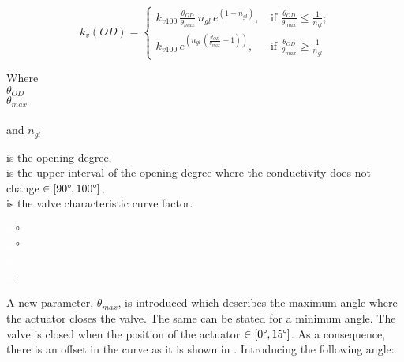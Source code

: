 \begin{equation}
\label{kvFunction}
 k_v(OD) =
		\left\{
		\begin{array}{ll}
		
		k_{v100} \, \frac{\theta_{OD}}{\theta_{max}} \, n_{gl} \, e^{(1-n_{gl})} \text{,} & \mbox{ if } 								\frac{\theta_{OD}}{\theta_{max}} \leq \frac{1}					{n_{gl}} \text{;}
\\
		k_{v100} \, e^{(n_{gl} \,(\frac{\theta_{OD}}{\theta_{max}}-1))} \text{,} & \mbox{ if } \frac{\theta_{OD}}{\theta_{max}} \geq \frac{1}{n_{gl}}

		\end{array}
		\right.
\end{equation}	

 \begin{minipage}[t]{0.20\textwidth}
Where\\
\hspace*{8mm} $\theta_{OD}$ \\
\hspace*{8mm} $\theta_{max}$ \\
\hspace*{8mm}  \\
and \hspace*{0.7mm} $n_{gl}$ 
\end{minipage}
\begin{minipage}[t]{0.68\textwidth}
\vspace*{2mm}
is the opening degree,\\ 
is the upper interval of the opening degree where the conductivity does not change $\in [90\degree, 100 \degree]$, \\
is the valve characteristic curve factor.
\end{minipage}
\begin{minipage}[t]{0.10\textwidth}
\vspace*{2mm}
\textcolor{White}{te}$\unit{\degree}$\\
\textcolor{White}{te}$\unit{\degree}$\\
\textcolor{White}{te}\\
\textcolor{White}{te}$\unit{\cdot}$
\end{minipage}	

A new parameter, $\theta_{max}$, is introduced which describes the maximum angle where the actuator closes the valve. The same can be stated for a minimum angle. The valve is closed when the position of the actuator $\in [0\degree,15\degree]$. As a consequence, there is an offset in the curve as it is shown in . Introducing the following angle:

